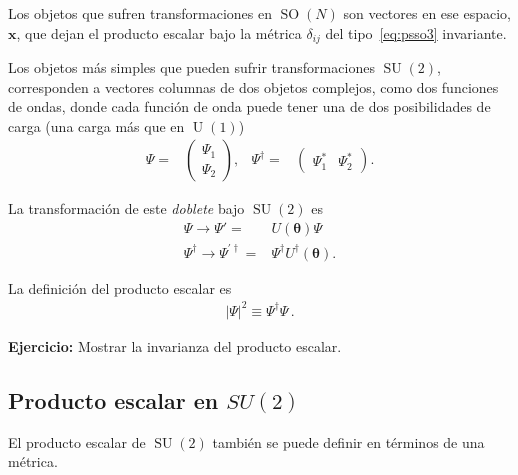 Los objetos que sufren transformaciones en $\operatorname{SO}(N)$ son vectores en ese espacio, $\boldsymbol{x}$, que dejan el producto escalar bajo la métrica $\delta_{ij}$ del tipo~\eqref{eq:psso3} invariante.

Los objetos más simples que pueden sufrir transformaciones  $\operatorname{SU}(2)$, corresponden a vectores columnas de dos objetos complejos, como dos funciones de ondas, donde cada función de onda puede tener una de dos posibilidades de carga (una carga más que en $\operatorname{U}(1)$)
\begin{align}
  \Psi=&
  \begin{pmatrix}
    \Psi_1\\
    \Psi_2
  \end{pmatrix},&
  \Psi^{\dagger}=&
  \begin{pmatrix}
    \Psi_1^{*} &
    \Psi_2^{*}
  \end{pmatrix}.                  
\end{align}

La transformación de este \emph{doblete} bajo $\operatorname{SU}(2)$ es
\begin{align}
  \Psi\to \Psi'=& U(\boldsymbol{\theta}) \Psi \nonumber\\
  \Psi^{\dagger}\to \Psi^{\prime\dagger} =& \Psi^{\dagger}U^{\dagger}(\boldsymbol{\theta}).
\end{align}

La definición del producto escalar es
\begin{align}
  | \Psi |^2 \equiv \Psi^{\dagger}\Psi\,. 
\end{align}

\textbf{Ejercicio:} Mostrar la invarianza del producto escalar.

\subsection{Producto escalar en $SU(2)$}
El producto escalar de $\operatorname{SU}(2)$ también se puede definir en términos de una métrica.


